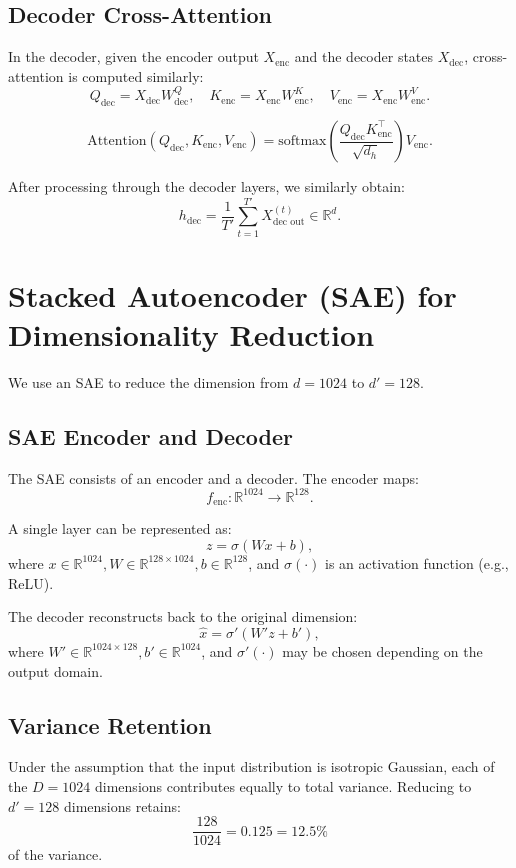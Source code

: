 \documentclass[11pt,a4paper]{article}
\begin{document}
\subsection{Decoder Cross-Attention}
In the decoder, given the encoder output $X_{\text{enc}}$ and the decoder states $X_{\text{dec}}$, cross-attention is computed similarly:
\[
Q_{\text{dec}} = X_{\text{dec}} W_{\text{dec}}^Q, \quad K_{\text{enc}} = X_{\text{enc}} W_{\text{enc}}^K, \quad V_{\text{enc}} = X_{\text{enc}} W_{\text{enc}}^V.
\]

\[
\text{Attention}(Q_{\text{dec}},K_{\text{enc}},V_{\text{enc}}) = \text{softmax}\left(\frac{Q_{\text{dec}}K_{\text{enc}}^\top}{\sqrt{d_h}}\right)V_{\text{enc}}.
\]

After processing through the decoder layers, we similarly obtain:
\[
h_{\text{dec}} = \frac{1}{T'}\sum_{t=1}^{T'} X_{\text{dec out}}^{(t)} \in \mathbb{R}^{d}.
\]

\section{Stacked Autoencoder (SAE) for Dimensionality Reduction}
We use an SAE to reduce the dimension from $d=1024$ to $d'=128$.

\subsection{SAE Encoder and Decoder}
The SAE consists of an encoder and a decoder. The encoder maps:
\[
f_{\text{enc}}: \mathbb{R}^{1024} \to \mathbb{R}^{128}.
\]

A single layer can be represented as:
\[
z = \sigma(Wx + b),
\]
where $x \in \mathbb{R}^{1024}, W \in \mathbb{R}^{128 \times 1024}, b \in \mathbb{R}^{128}$, and $\sigma(\cdot)$ is an activation function (e.g., ReLU).

The decoder reconstructs back to the original dimension:
\[
\hat{x} = \sigma'(W' z + b'),
\]
where $W' \in \mathbb{R}^{1024 \times 128}, b' \in \mathbb{R}^{1024}$, and $\sigma'(\cdot)$ may be chosen depending on the output domain.

\subsection{Variance Retention}
Under the assumption that the input distribution is isotropic Gaussian, each of the $D=1024$ dimensions contributes equally to total variance. Reducing to $d'=128$ dimensions retains:
\[
\frac{128}{1024} = 0.125 = 12.5\%
\]
of the variance.
\end{document}
